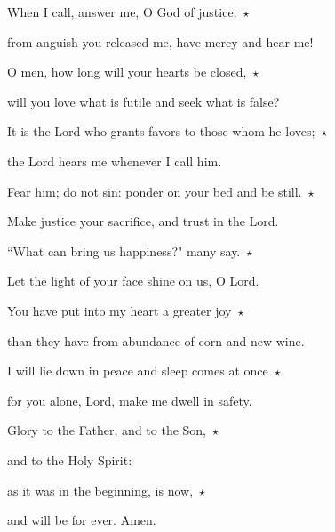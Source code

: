 \noindent  When I call, answer me, O God of justice;~$\star$~\nopagebreak

from anguish you released me, have mercy and hear me!

\noindent O men, how long will your hearts be closed,~$\star$~\nopagebreak

will you love what is futile and seek what is false?

\noindent It is the Lord who grants favors to those whom he loves;~$\star$~\nopagebreak

the Lord hears me whenever I call him.

\noindent Fear him; do not sin: ponder on your bed and be still.~$\star$~\nopagebreak

Make justice your sacrifice, and trust in the Lord.

\noindent ``What can bring us happiness?" many say.~$\star$~\nopagebreak

Let the light of your face shine on us, O Lord.

\noindent You have put into my heart a greater joy~$\star$~\nopagebreak

than they have from abundance of corn and new wine.

\noindent I will lie down in peace and sleep comes at once~$\star$~\nopagebreak

for you alone, Lord, make me dwell in safety.

\noindent Glory to the Father, and to the Son,~$\star$~\nopagebreak

and to the Holy Spirit:

\noindent as it was in the beginning, is now,~$\star$~\nopagebreak

and will be for ever. Amen.